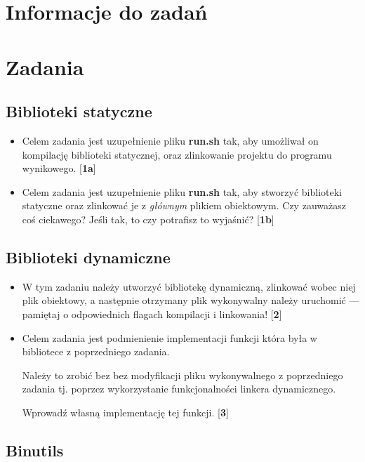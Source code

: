 \documentclass[12pt]{article}
\begin{document}
\tableofcontents
\pagebreak



\section{Informacje do zadań}

\section{Zadania}
\subsection{Biblioteki statyczne}
\begin{itemize}
\item Celem zadania jest uzupełnienie pliku \textbf{run.sh} tak, aby
  umożliwał on kompilację biblioteki statycznej, oraz zlinkowanie projektu do
  programu wynikowego. [\textbf{1a}]
\item Celem zadania jest uzupełnienie pliku \textbf{run.sh} tak, aby
  stworzyć biblioteki statyczne oraz zlinkować je z \textit{głównym} plikiem
  obiektowym. Czy zauważasz coś ciekawego? Jeśli tak, to czy potrafisz to
  wyjaśnić? [\textbf{1b}]
\end{itemize}
\subsection{Biblioteki dynamiczne}
\begin{itemize}
\item W tym zadaniu należy utworzyć bibliotekę dynamiczną, zlinkować wobec niej
  plik obiektowy, a następnie otrzymany plik wykonywalny należy uruchomić ---
  pamiętaj o odpowiednich flagach kompilacji i linkowania! [\textbf{2}]
\item Celem zadania jest podmienienie implementacji funkcji która była w
  bibliotece z poprzedniego zadania.

  Należy to zrobić bez bez modyfikacji pliku wykonywalnego z poprzedniego
  zadania tj. poprzez wykorzystanie funkcjonalności linkera dynamicznego.

  Wprowadź własną implementację tej funkcji. [\textbf{3}]
\end{itemize}
\subsection{Binutils}
\end{document}
